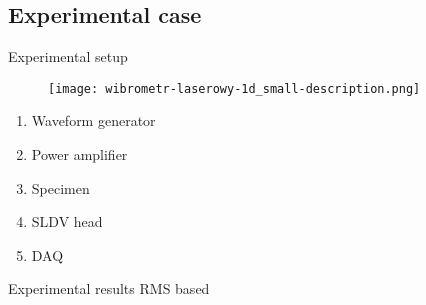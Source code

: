 \documentclass[10pt,aspectratio=169]{beamer} %
\begin{document}
\subsection{Experimental case}
\setcounter{subfigure}{0}
\begin{frame}{Experimental setup}
	\begin{minipage}[t]{0.55\textwidth}
		\begin{figure}
			\centering
			\texttt{[image: wibrometr-laserowy-1d\_small-description.png]}
		\end{figure}
	\end{minipage}
	\begin{minipage}[t]{0.4\textwidth}
		\begin{enumerate}
			\item Waveform generator
			\item Power amplifier	
			\item Specimen
			\item SLDV head
			\item DAQ
		\end{enumerate}
	\end{minipage}
\end{frame}

\setcounter{subfigure}{0}
\begin{frame}{Experimental results RMS based}
	\centering
	\begin{figure}
		\qquad
		\qquad
		\qquad
		\\
		\qquad
		\qquad
	\end{figure}
\end{frame}
\end{document}
